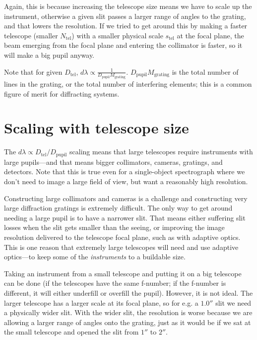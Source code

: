 \documentclass[12pt]{article}
\begin{document}
Again, this is because increasing the telescope size
means we have to scale up the instrument, otherwise a given
slit passes a larger range of angles to the grating, and that
lowers the resolution.  If we tried to get around this by
making a faster telescope (smaller $N_{\mathrm{tel}}$) with a smaller physical 
scale $s_{\mathrm{tel}}$ at the focal plane, the beam emerging from the focal 
plane and entering the collimator is faster, so it will make a
big pupil anyway.

Note that for given $D_{\mathrm{tel}}$,
$d\lambda \propto \frac{1}{D_{\mathrm{pupil}} M_{\mathrm{grating}}}$.  
$D_{\mathrm{pupil}} M_{\mathrm{grating}}$ is the total number of lines in the grating,
or the total number of interfering elements; this is a common
figure of merit for diffracting systems.

\section{Scaling with telescope size}

The $d\lambda \propto D_{\mathrm{tel}}/D_{\mathrm{pupil}}$ scaling means that large telescopes 
require 
instruments with large pupils---and that means bigger collimators,
cameras, gratings, and detectors.  Note that this is true even for a
single-object spectrograph where we don't need to image a large field
of view, but want a reasonably high resolution.  

Constructing
large collimators and cameras is a challenge and constructing
very large diffraction gratings is extremely difficult.
The only way to get around needing a large pupil is to have
a narrower slit.  That means either suffering slit losses when the
slit gets smaller than the seeing, or improving
the image resolution delivered to the telescope focal plane, such as
with adaptive optics.  This is one reason that extremely large
telescopes will need and use adaptive optics---to keep some of 
the {\it instruments} to a buildable size.

Taking an instrument from a small telescope and putting it on
a big telescope can be done (if the telescopes have the same 
f-number; if the f-number is different, it will either underfill
or overfill the pupil).  However, it is not ideal.  The larger
telescope has a larger scale at its focal plane, so for e.g.
a $1.0''$ slit we need a physically wider slit.  With the wider
slit, the resolution is worse because we are allowing a 
larger range of angles onto the grating, just as it would 
be if we sat at the small telescope and opened the slit from $1''$ to $2''$.
\end{document}
